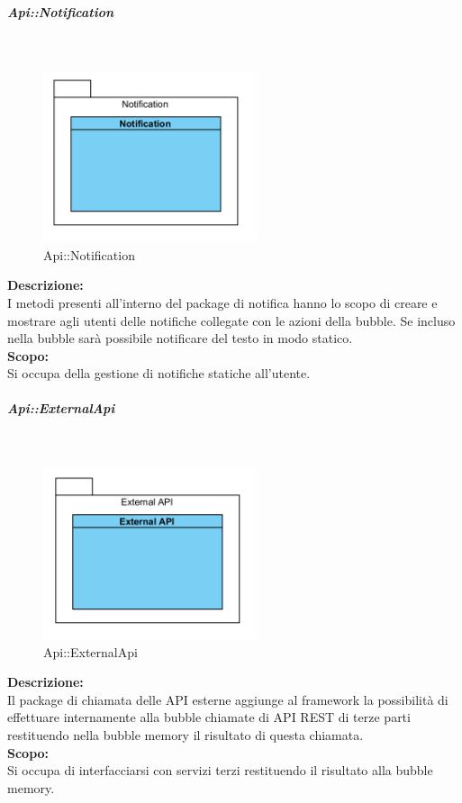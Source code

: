 \begin{samepage}
\subparagraph{Api\-::Notification}\label{api-notifica}\mbox{}\\
\nopagebreak
\begin{figure}[H]
	\centering
	\includegraphics[height=5cm]{diagrammi_img/classi_e_package/api_notifica.png}
	\caption{Api\-::Notification}
\end{figure}
\end{samepage}
\textbf{Descrizione:}\\ 
I metodi presenti all'interno del package di notifica hanno lo scopo di creare e mostrare agli utenti delle notifiche collegate con le azioni della bubble. Se incluso nella bubble sarà possibile notificare del testo in modo statico.\\
\textbf{Scopo:}\\
Si occupa della gestione di notifiche statiche all'utente.\\

\begin{samepage}
\subparagraph{Api\-::External\-Api}\label{api-esterne}\mbox{}\\
\nopagebreak
\begin{figure}[H]
	\centering
	\includegraphics[height=5cm]{diagrammi_img/classi_e_package/api_esterne.png}
	\caption{Api\-::External\-Api}
\end{figure}
\end{samepage}
\textbf{Descrizione:}\\ 
Il package di chiamata delle API esterne aggiunge al framework la possibilità di effettuare internamente alla bubble chiamate di API REST di terze parti restituendo nella bubble memory il risultato di questa chiamata. \\
\textbf{Scopo:}\\
Si occupa di interfacciarsi con servizi terzi restituendo il risultato alla bubble memory.\\

